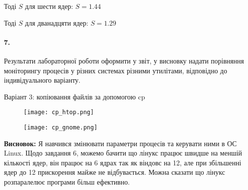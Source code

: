 \documentclass[12pt]{extarticle}
\begin{document}
Тоді $S$ для шести ядер: $S = 1.44$

Тоді $S$ для дванадцяти ядер: $S = 1.29$

\paragraph{7.} Результати лабораторної роботи оформити у звіт, у висновку надати
порівняння моніторингу процесів у різних системах різними утилітами,
відповідно до індивідуального варіанту.

Варіант 3: копіювання файлів за допомогою cp

\vspace{12pt}

\vspace{12pt}
\begin{figure}[H]
    \centering
    \texttt{[image: cp\_htop.png]}
    \caption{}
\end{figure}
\begin{figure}[H]
    \centering
    \texttt{[image: cp\_gnome.png]}
    \caption{}
\end{figure}
\textbf{Висновок:} Я навчився змінювати параметри процесів та керувати ними в ОС Linux. Щодо 
завдання 6, можемо бачити що лінукс працює швидше на меншій кількості ядер, він 
працює на 6 ядрах так як віндовс на 12, але при збільшенні ядер до 12 прискорення майже не відбувається.
Можна сказати що лінукс розпаралелює програми більш ефективно.
\end{document}

